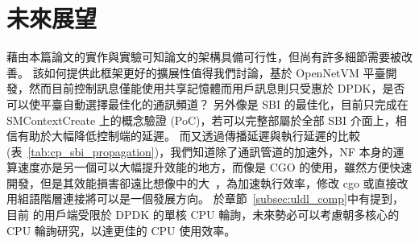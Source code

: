 \chapter{未來展望}
\label{chapter:future}


藉由本篇論文的實作與實驗可知論文的架構具備可行性，但尚有許多細節需要被改善。
該如何提供此框架更好的擴展性值得我們討論，\LHCN 基於 OpenNetVM 平臺開發，然而目前控制訊息僅能使用共享記憶體而用戶訊息則只受惠於 DPDK，是否可以使平臺自動選擇最佳化的通訊頻道？
另外像是 SBI 的最佳化，目前只完成在 SMContextCreate 上的概念驗證 (PoC)，若可以完整部屬於全部 SBI 介面上，相信有助於大幅降低控制端的延遲。
而又透過傳播延遲與執行延遲的比較 (表~\ref{tab:cp_sbi_propagation})，我們知道除了通訊管道的加速外，NF 本身的運算速度亦是另一個可以大幅提升效能的地方，而像是 CGO 的使用，雖然方便快速開發，但是其效能損害卻遠比想像中的大~\cite{cgo_not_go}，為加速執行效率，修改 cgo 或直接改用組語階層連接將可以是一個發展方向。
於章節~\ref{subsec:uldl_comp}中有提到，目前 \LHCN 的用戶端受限於 DPDK 的單核 CPU 輪詢，未來勢必可以考慮朝多核心的 CPU 輪詢研究，以達更佳的 CPU 使用效率。
